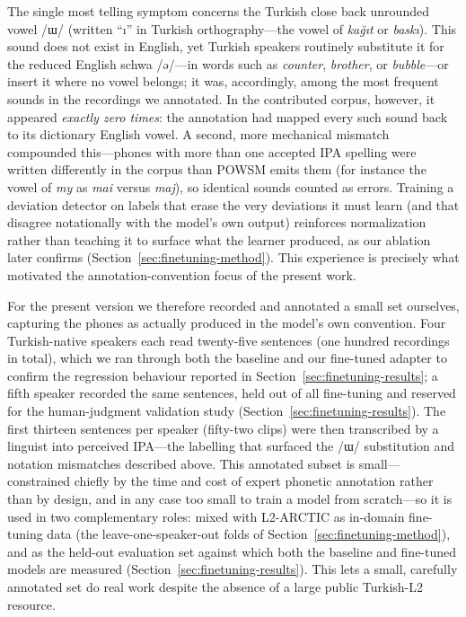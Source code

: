 \documentclass[a4paper,12pt]{report}
\newcommand{\ipa}[1]{{\ipafont #1}}
\begin{document}
The single most telling symptom concerns the Turkish close back unrounded vowel \ipa{/ɯ/} (written ``\i'' in Turkish orthography---the vowel of \emph{ka\u{g}\i t} or \emph{bask\i}). This sound does not exist in English, yet Turkish speakers routinely substitute it for the reduced English schwa \ipa{/ə/}---in words such as \emph{counter}, \emph{brother}, or \emph{bubble}---or insert it where no vowel belongs; it was, accordingly, among the most frequent sounds in the recordings we annotated. In the contributed corpus, however, it appeared \emph{exactly zero times}: the annotation had mapped every such sound back to its dictionary English vowel. A second, more mechanical mismatch compounded this---phones with more than one accepted IPA spelling were written differently in the corpus than POWSM emits them (for instance the vowel of \emph{my} as \emph{mai} versus \emph{maj}), so identical sounds counted as errors. Training a deviation detector on labels that erase the very deviations it must learn (and that disagree notationally with the model's own output) reinforces normalization rather than teaching it to surface what the learner produced, as our ablation later confirms (Section~\ref{sec:finetuning-method}). This experience is precisely what motivated the annotation-convention focus of the present work.

For the present version we therefore recorded and annotated a small set ourselves, capturing the phones as actually produced in the model's own convention. Four Turkish-native speakers each read twenty-five sentences (one hundred recordings in total), which we ran through both the baseline and our fine-tuned adapter to confirm the regression behaviour reported in Section~\ref{sec:finetuning-results}; a fifth speaker recorded the same sentences, held out of all fine-tuning and reserved for the human-judgment validation study (Section~\ref{sec:finetuning-results}). The first thirteen sentences per speaker (fifty-two clips) were then transcribed by a linguist into perceived IPA---the labelling that surfaced the \ipa{/ɯ/} substitution and notation mismatches described above. This annotated subset is small---constrained chiefly by the time and cost of expert phonetic annotation rather than by design, and in any case too small to train a model from scratch---so it is used in two complementary roles: mixed with L2-ARCTIC as in-domain fine-tuning data (the leave-one-speaker-out folds of Section~\ref{sec:finetuning-method}), and as the held-out evaluation set against which both the baseline and fine-tuned models are measured (Section~\ref{sec:finetuning-results}). This lets a small, carefully annotated set do real work despite the absence of a large public Turkish-L2 resource.
\end{document}
